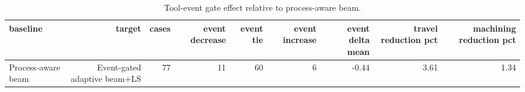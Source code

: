 \begin{table}[t]
\centering
\caption{Tool-event gate effect relative to process-aware beam.}
\label{tab:tool-event-gate-summary}
\begin{tabular}{lrrrrrrrr}
\toprule
baseline & target & cases & event decrease & event tie & event increase & event delta mean & travel reduction pct & machining reduction pct \\
\midrule
Process-aware beam & Event-gated adaptive beam+LS & 77 & 11 & 60 & 6 & -0.44 & 3.61 & 1.34 \\
\bottomrule
\end{tabular}
\end{table}
